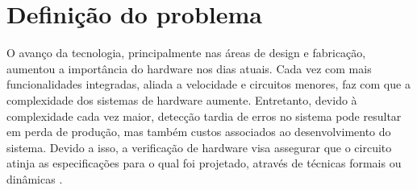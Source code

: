 % 

\section{Definição do problema}

O avanço da tecnologia, principalmente nas áreas de design e fabricação, aumentou a importância do hardware nos dias atuais. Cada vez com mais funcionalidades integradas, aliada a velocidade e circuitos menores, faz com que a complexidade dos sistemas de hardware aumente. Entretanto, devido à complexidade cada vez maior, detecção tardia de erros no sistema pode resultar em perda de produção, mas também custos associados ao desenvolvimento do sistema\cite{gupta1992formal}. Devido a isso, a verificação de hardware visa assegurar que o circuito atinja as especificações para o qual foi projetado, através de técnicas formais ou dinâmicas \cite{boule2007efficient}.


